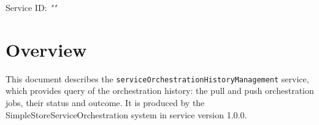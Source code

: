 \documentclass[a4paper]{arrowhead}
\begin{document}
\sloppy

\ArrowheadSetup

\begin{center}
  \vspace*{1cm}
  \huge{\arrowtitle}

  \vspace*{0.2cm}
  \LARGE{\arrowtype}
  \vspace*{1cm}

  \Large{Service ID: \textit{"\arrowid"}}

  \vspace*{\fill}


  \vspace*{1cm}
  \vspace*{\fill}

  \begin{abstract}
    This document describes the \texttt{service\allowbreak{}Orchestration\allowbreak{}History\allowbreak{}Management} service, version 1.0.0, produced by the SimpleStoreServiceOrchestration core system of Arrowhead 5.2.2.
  \end{abstract}

  \vspace*{1cm}
\end{center}

\newpage

\tableofcontents
\newpage

\section{Overview}
\label{sec:overview}

This document describes the \texttt{service\allowbreak{}Orchestration\allowbreak{}History\allowbreak{}Management} service, which provides query of the orchestration history: the pull and push orchestration jobs, their status and outcome.
It is produced by the SimpleStoreServiceOrchestration system \cite{ssso-sysd} in service version 1.0.0.
\end{document}
